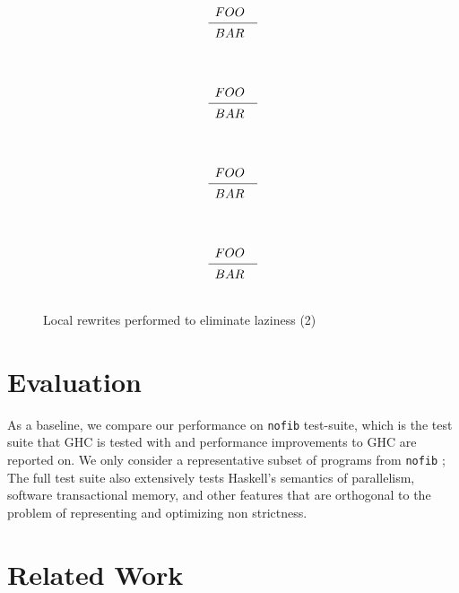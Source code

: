 \documentclass[sigplan,\review anonymous]{acmart}
\makeatletter
\renewcommand{\inference}[3][]{%
  \[\begin{array}[b]{@{}lc}
      \\
      \begin{array}[b]{l} #2 \end{array}
      \smash{\raisebox{-0.6\normalbaselineskip}{\scriptsize}} \\
      \cmidrule[0.4pt]{1-1}
      \begin{array}[t]{l} #3 \end{array}
      \\
      \\
  \end{array}\]
}
\newcommand{\nofib}{\texttt{nofib} }
\makeatother
\begin{document}
\begin{figure*}

\begin{minipage}[t][1cm][b]{0.5\textwidth}
{\footnotesize
\inference{
FOO
}{
BAR
}
} %
\end{minipage}



\begin{minipage}[t][1cm][b]{0.5\textwidth}
{\footnotesize
\inference{
FOO
}{
BAR
}
} %
\end{minipage}

\begin{minipage}[t][1cm][b]{0.5\textwidth}
{\footnotesize
\inference{
FOO
}{
BAR
}
} %
\end{minipage}


\begin{minipage}[t][1cm][b]{0.5\textwidth}
{\footnotesize
\inference{
FOO
}{
BAR
}
} %
\end{minipage}

\caption{Local rewrites performed to eliminate laziness (2)}
\end{figure*}


\section{Evaluation}

As a baseline, we compare our performance on \nofib test-suite, which is the
test suite that GHC is tested with and performance improvements to GHC 
are reported on. We only consider a representative subset of programs from \nofib;
The full test suite also extensively tests Haskell's semantics of parallelism, 
software transactional memory, and other features that are orthogonal to the
problem of representing and optimizing non strictness.

\section{Related Work}
\end{document}
